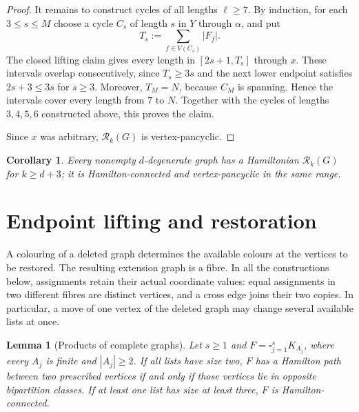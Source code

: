 \documentclass[11pt]{article}
\newtheorem{lemma}[theorem]{Lemma}
\newtheorem{corollary}[theorem]{Corollary}
\theoremstyle{remark}
\newcommand{\Rk}{\mathcal R_k}
\numberwithin{equation}{section}
\numberwithin{table}{section}
\begin{document}
\begin{proof}
It remains to construct cycles of all lengths $\ell\ge7$.
By induction, for each $3\le s\le M$ choose a cycle $C_s$ of length
$s$ in $Y$ through $\alpha$, and put
\[
T_s:=\sum_{f\in V(C_s)}|F_f|.
\]
The closed lifting claim gives every length in $[2s+1,T_s]$ through
$x$. These intervals overlap consecutively, since $T_s\ge3s$ and
the next lower endpoint satisfies $2s+3\le3s$ for $s\ge3$.
Moreover, $T_M=N$, because $C_M$ is spanning. Hence the intervals
cover every length from $7$ to $N$. Together with the cycles of
lengths $3,4,5,6$ constructed above, this proves the claim.

Since $x$ was arbitrary, $\Rk(G)$ is vertex-pancyclic.
\end{proof}


\begin{corollary}
\label{cor:degenerate-hamiltonian}
Every nonempty $d$-degenerate graph has a Hamiltonian $\Rk(G)$ for $k\ge d+3$; it is Hamilton-connected and vertex-pancyclic in the same range.
\end{corollary}


\section{Endpoint lifting and restoration}
\label{sec:restoration}

A colouring of a deleted graph determines the available colours at the
vertices to be restored.  The resulting extension graph is a fibre.  In
all the constructions below, assignments retain their actual coordinate
values: equal assignments in two different fibres are distinct vertices,
and a cross edge joins their two copies.  In particular, a move of one
vertex of the deleted graph may change several available lists at once.

\begin{lemma}[Products of complete graphs]
\label{lem:product}
Let $s\ge1$ and $F=\square_{j=1}^s K_{A_j}$, where every $A_j$ is
finite and $|A_j|\ge2$.  If all lists have size two, $F$ has a
Hamilton path between two prescribed vertices if and only if those
vertices lie in opposite bipartition classes.  If at least one list has
size at least three, $F$ is Hamilton-connected.
\end{lemma}
\end{document}
